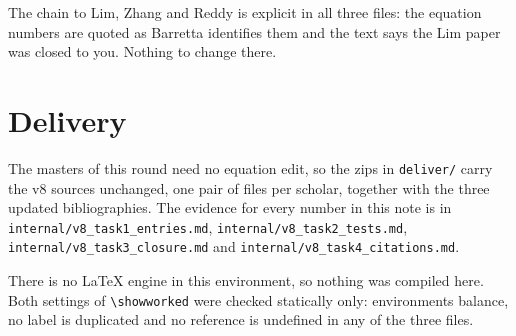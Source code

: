 \documentclass[11pt,a4paper]{article}
\begin{document}
The chain to Lim, Zhang and Reddy is explicit in all three files: the equation numbers are quoted as
Barretta identifies them and the text says the Lim paper was closed to you. Nothing to change
there.

\section*{Delivery}

The masters of this round need no equation edit, so the zips in \texttt{deliver/} carry the v8
sources unchanged, one pair of files per scholar, together with the three updated bibliographies.
The evidence for every number in this note is in \texttt{internal/v8\_task1\_entries.md},
\texttt{internal/v8\_task2\_tests.md}, \texttt{internal/v8\_task3\_closure.md} and
\texttt{internal/v8\_task4\_citations.md}.

There is no \LaTeX{} engine in this environment, so nothing was compiled here. Both settings of
\texttt{\textbackslash showworked} were checked statically only: environments balance, no label is
duplicated and no reference is undefined in any of the three files.
\end{document}
